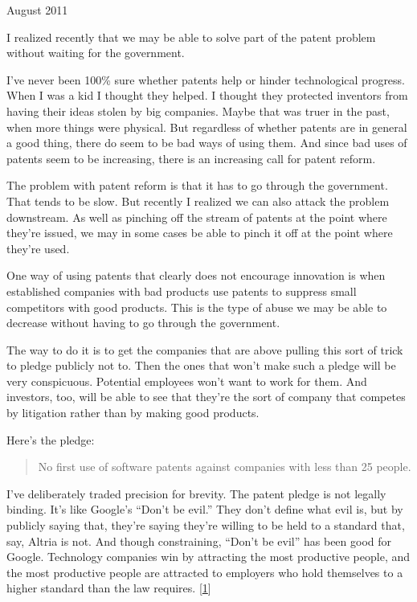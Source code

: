 August 2011

I realized recently that we may be able to solve part of the patent
problem without waiting for the government.

I've never been 100\% sure whether patents help or hinder technological
progress. When I was a kid I thought they helped. I thought they
protected inventors from having their ideas stolen by big companies.
Maybe that was truer in the past, when more things were physical. But
regardless of whether patents are in general a good thing, there do seem
to be bad ways of using them. And since bad uses of patents seem to be
increasing, there is an increasing call for patent reform.

The problem with patent reform is that it has to go through the
government. That tends to be slow. But recently I realized we can also
attack the problem downstream. As well as pinching off the stream of
patents at the point where they're issued, we may in some cases be able
to pinch it off at the point where they're used.

One way of using patents that clearly does not encourage innovation is
when established companies with bad products use patents to suppress
small competitors with good products. This is the type of abuse we may
be able to decrease without having to go through the government.

The way to do it is to get the companies that are above pulling this
sort of trick to pledge publicly not to. Then the ones that won't make
such a pledge will be very conspicuous. Potential employees won't want
to work for them. And investors, too, will be able to see that they're
the sort of company that competes by litigation rather than by making
good products.

Here's the pledge:

\begin{quote}
No first use of software patents against companies with less than 25
people.
\end{quote}

I've deliberately traded precision for brevity. The patent pledge is not
legally binding. It's like Google's ``Don't be evil.'' They don't define
what evil is, but by publicly saying that, they're saying they're
willing to be held to a standard that, say, Altria is not. And though
constraining, ``Don't be evil'' has been good for Google. Technology
companies win by attracting the most productive people, and the most
productive people are attracted to employers who hold themselves to a
higher standard than the law requires. {[}\hyperref[f1n]{1}{]}


